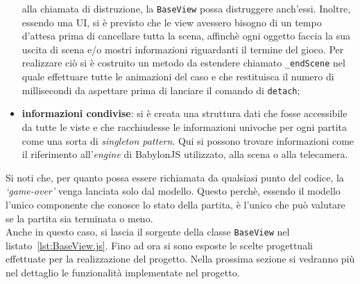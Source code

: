 \begin{itemize}
    alla chiamata di distruzione, la \texttt{BaseView} possa distruggere anch'essi. Inoltre, essendo una UI, si è previsto che le view avessero bisogno di un tempo d'attesa prima di 
    cancellare tutta la scena, affinchè ogni oggetto faccia la sua uscita di scena e/o mostri informazioni riguardanti il termine del gioco. Per realizzare ciò si è costruito un metodo 
    da estendere chiamato \texttt{\_endScene} nel quale effettuare tutte le animazioni del caso e che restituisca il numero di millisecondi da aspettare prima di lanciare il comando di 
    \texttt{detach};
    \item \textbf{informazioni condivise}: si è creata una struttura dati che fosse accessibile da tutte le viste e che racchiudesse le informazioni univoche per ogni partita come una sorta
    di \textit{singleton pattern}. Qui si possono trovare informazioni come il riferimento all'\textit{engine} di BabylonJS utilizzato, alla scena o alla telecamera.
\end{itemize}
Si noti che, per quanto possa essere richiamata da qualsiasi punto del codice, la \textit{`game-over'} venga lanciata solo dal modello. Questo perchè, essendo il modello l'unico 
componente che conosce lo stato della partita, è l'unico che può valutare se la partita sia terminata o meno.\\
Anche in questo caso, si lascia il sorgente della classe \texttt{BaseView} nel listato~\ref{lst:BaseView.js}.
Fino ad ora si sono esposte le scelte progettuali effettuate per la realizzazione del progetto. Nella prossima sezione si vedranno più nel dettaglio le funzionalità implementate
nel progetto.